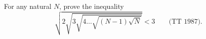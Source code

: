 For any natural $N$, prove the inequality
\[ \sqrt{2\sqrt{3\sqrt{4\ldots\sqrt{(N - 1)\sqrt{N}}}}} < 3 \qquad \text{(TT 1987).} \]

